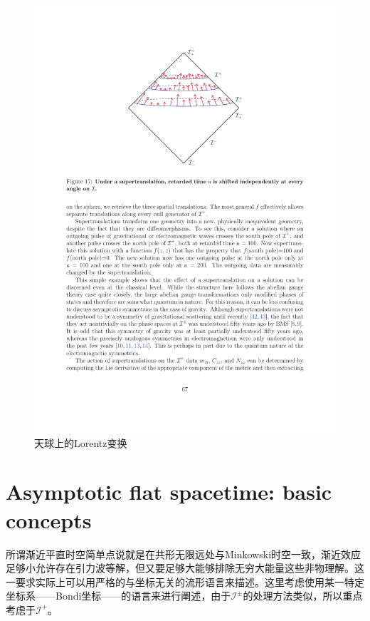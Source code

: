 \begin{figure}[htbp]
	\centering
	\includegraphics{figs/fig2.pdf}
	\caption{天球上的Lorentz变换}
\end{figure}

\section{Asymptotic flat spacetime: basic concepts}
所谓渐近平直时空简单点说就是在共形无限远处与Minkowski时空一致，渐近效应足够小允许存在引力波等解，但又要足够大能够排除无穷大能量这些非物理解。这一要求实际上可以用严格的与坐标无关的流形语言来描述\cite{lcb2}。这里考虑使用某一特定坐标系——Bondi坐标——的语言来进行阐述\cite{Compere:2019qed,Strominger:2017zoo}，由于$\mathcal{I}^\pm$的处理方法类似，所以重点考虑于$\mathcal{I}^+$。

